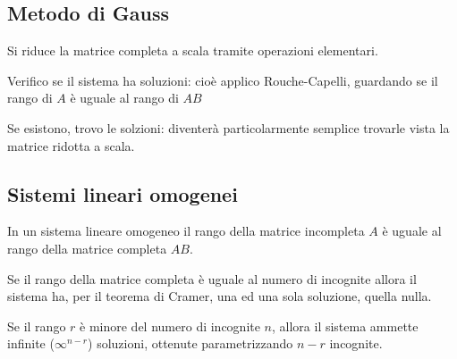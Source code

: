\subsection{Metodo di Gauss}

Si riduce la matrice completa a scala tramite operazioni elementari.

Verifico se il sistema ha soluzioni: cioè applico Rouche-Capelli, guardando se il rango di $A$ è uguale al rango di $AB$

Se esistono, trovo le solzioni: diventerà particolarmente semplice trovarle vista la matrice ridotta a scala.

\subsection{Sistemi lineari omogenei}

\begin{property}
In un sistema lineare omogeneo il rango della matrice incompleta $A$ è uguale al rango della matrice completa $AB$.
\end{property}

\begin{property}
Se il rango della matrice completa è uguale al numero di incognite allora il sistema ha, per il teorema di Cramer, una ed una sola soluzione, quella nulla.
\end{property}

\begin{property}
Se il rango $r$ è minore del numero di incognite $n$, allora il sistema ammette infinite ($\infty^{n-r}$) soluzioni, ottenute parametrizzando $n-r$ incognite.
\end{property}